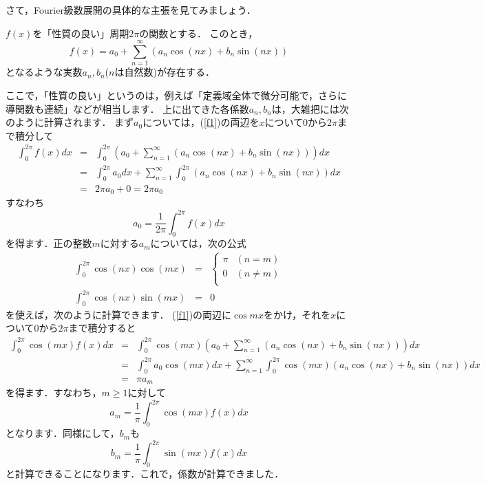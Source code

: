 さて，Fourier級数展開の具体的な主張を見てみましょう．
\begin{center}
$f(x)$を「性質の良い」周期$2 \pi$の関数とする．
このとき，
\begin{equation}
	f(x)=a_{0}+\sum_{n=1}^{\infty}\left( a_{n}\cos(nx)+b_{n}\sin (nx) \right)
	\label{f1}
\end{equation}
となるような実数$a_n, b_n$($n$は自然数)が存在する．
\end{center}
ここで，「性質の良い」というのは，例えば「定義域全体で微分可能で，さらに導関数も連続」などが相当します．
上に出てきた各係数$a_n, b_n$は，大雑把には次のように計算されます．
まず$a_0$については，(\ref{f1})の両辺を$x$について$0$から$2 \pi$まで積分して
\begin{eqnarray*}
	\int_{0}^{2 \pi}f(x)dx &=& \int_{0}^{2\pi} \left( a_{0}+\sum_{n=1}^{\infty}\left( a_{n}\cos(nx)+b_{n}\sin (nx) \right) \right) dx \\
	&=& \int_{0}^{2 \pi} a_{0} dx +\sum_{n=1}^{\infty} \int_{0}^{2\pi}\left( a_{n}\cos(nx)+b_{n}\sin (nx) \right) dx \\
	&=& 2\pi a_{0}+0=2 \pi a_{0}
\end{eqnarray*}
すなわち
\[
	a_0=\frac{1}{2\pi}\int_{0}^{2 \pi}f(x)dx
\]
を得ます．正の整数$m$に対する$a_m$については，次の公式
\begin{eqnarray*}
	\int_{0}^{2 \pi} \cos (nx) \cos (mx) &=&
	\begin{cases}
		\pi & (n=m) \\
		0 & (n \neq m) \\
	\end{cases}
	\\
	\int_{0}^{2 \pi} \cos (nx) \sin (mx) &=& 0
\end{eqnarray*}
を使えば，次のように計算できます．
(\ref{f1})の両辺に$\cos mx$をかけ，それを$x$について$0$から$2 \pi$まで積分すると
\begin{eqnarray*}
	\int_{0}^{2 \pi} \cos (mx) f(x) dx &=& \int_{0}^{2 \pi} \cos (mx)\left( a_{0}+\sum_{n=1}^{\infty}\left( a_{n}\cos(nx)+b_{n}\sin (nx) \right) \right) dx \\
	&=& \int_{0}^{2 \pi} a_{0} \cos (mx) dx +\sum_{n=1}^{\infty} \int_{0}^{2\pi} \cos (mx)\left( a_{n}\cos(nx)+b_{n}\sin (nx) \right) dx \\
	&=& \pi a_{m}
\end{eqnarray*}
を得ます．すなわち，$m \ge 1$に対して
\[
	a_{m}=\frac{1}{\pi} \int_{0}^{2 \pi} \cos (mx) f(x) dx
\]
となります．同様にして，$b_m$も
\[
	b_{m}=\frac{1}{\pi} \int_{0}^{2 \pi} \sin (mx) f(x) dx
\]
と計算できることになります．これで，係数が計算できました．

